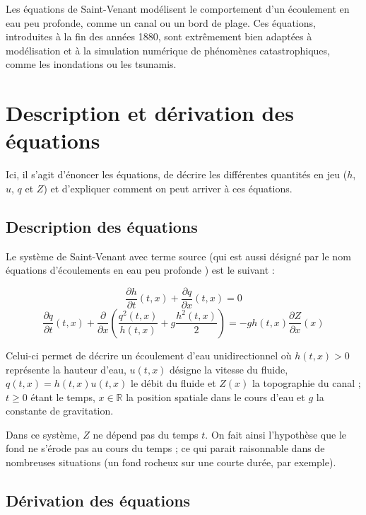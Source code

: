 \documentclass[
11pt, %
francais, %
singlespacing, %
headsepline, %
]{MastersDoctoralThesis} %
\theoremstyle{definition}
\begin{document}
\newpage

Les équations de Saint-Venant modélisent le comportement d'un écoulement en eau peu profonde, comme un canal ou un bord de plage.
Ces équations, introduites à la fin des années 1880, sont extrêmement bien adaptées à modélisation et à la simulation numérique de phénomènes 
catastrophiques, comme les inondations ou les tsunamis.

\section{Description et dérivation des équations}

Ici, il s'agit  d'énoncer les équations, de décrire les différentes quantités en jeu ($h$, $u$, $q$ et $Z$)
et d'expliquer comment on peut arriver à ces équations.

\subsection{Description des équations}

Le système de Saint-Venant avec terme source (qui est aussi désigné par le nom \og équations d'écoulements en eau peu profonde  \fg{}) est le suivant :

\begin{equation} \frac{\partial h}{\partial t}(t,x)+\frac{\partial q}{\partial x}(t,x)=0 \label{sveq1} \end{equation}
\begin{equation} \frac{\partial q}{\partial t}(t,x)+\frac{\partial}{\partial x}(\frac{q^{2}(t,x)}{h(t,x)}+g\frac{h^{2}(t,x)}{2})=-gh(t,x)\frac{\partial Z}{\partial x}(x) \label{sveq2} \end{equation}

Celui-ci permet de décrire un écoulement d'eau unidirectionnel où $h(t,x)>0$ représente la hauteur d'eau, $u(t,x)$ désigne la vitesse du fluide, $q(t,x)=h(t,x)u(t,x)$ le débit du fluide et $Z(x)$ la topographie du canal ; $t\geq0$ étant le temps, $x\in\mathbb{R}$ la position spatiale dans le cours d'eau et $g$ la constante de gravitation.

Dans ce système, $Z$ ne dépend pas du temps $t$. On
fait ainsi l'hypothèse que le fond ne s'érode pas au cours du temps ; ce qui parait raisonnable dans de nombreuses situations (un fond rocheux sur une courte durée, par exemple).

\subsection{Dérivation des équations}
\end{document}
